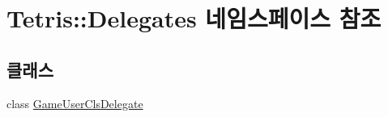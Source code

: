 \hypertarget{namespace_tetris_1_1_delegates}{}\section{Tetris\+:\+:Delegates 네임스페이스 참조}
\label{namespace_tetris_1_1_delegates}
\subsection*{클래스}
\begin{DoxyCompactItemize}
\item 
class \hyperlink{class_tetris_1_1_delegates_1_1_game_user_cls_delegate}{Game\+User\+Cls\+Delegate}
\end{DoxyCompactItemize}
